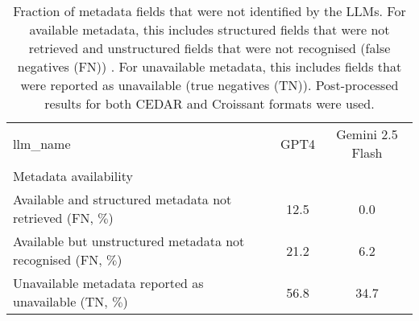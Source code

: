 \begin{table}
\caption{Fraction of metadata fields that were not identified by the LLMs. For available metadata, this includes structured fields that were not retrieved and unstructured fields that were not recognised (false negatives (FN)) . For unavailable metadata, this includes fields that were reported as unavailable (true negatives (TN)). Post-processed results for both CEDAR and Croissant formats were used.}
\label{tab:metadata_not_found}
\begin{tabular}{lcc}
\toprule
llm_name & GPT4 & Gemini 2.5 Flash \\
Metadata availability &  &  \\
\midrule
Available and structured metadata not retrieved (FN, $\%$) & 12.5 & 0.0 \\
Available but unstructured metadata not recognised (FN, $\%$) & 21.2 & 6.2 \\
Unavailable metadata reported as unavailable (TN, $\%$) & 56.8 & 34.7 \\
\bottomrule
\end{tabular}
\end{table}
